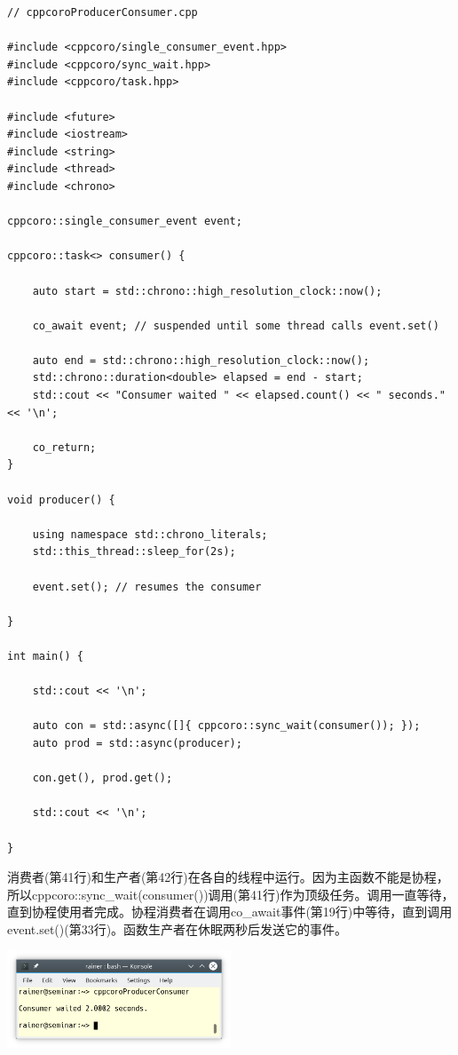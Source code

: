 \begin{lstlisting}[style=styleCXX]
// cppcoroProducerConsumer.cpp

#include <cppcoro/single_consumer_event.hpp>
#include <cppcoro/sync_wait.hpp>
#include <cppcoro/task.hpp>

#include <future>
#include <iostream>
#include <string>
#include <thread>
#include <chrono>

cppcoro::single_consumer_event event;

cppcoro::task<> consumer() {

	auto start = std::chrono::high_resolution_clock::now();
	
	co_await event; // suspended until some thread calls event.set()
	
	auto end = std::chrono::high_resolution_clock::now();
	std::chrono::duration<double> elapsed = end - start;
	std::cout << "Consumer waited " << elapsed.count() << " seconds." << '\n';
	
	co_return;
}

void producer() {

	using namespace std::chrono_literals;
	std::this_thread::sleep_for(2s);
	
	event.set(); // resumes the consumer

}

int main() {

	std::cout << '\n';
	
	auto con = std::async([]{ cppcoro::sync_wait(consumer()); });
	auto prod = std::async(producer);
	
	con.get(), prod.get();
	
	std::cout << '\n';

}
\end{lstlisting}

消费者(第41行)和生产者(第42行)在各自的线程中运行。因为主函数不能是协程，所以cppcoro::sync\_wait(consumer())调用(第41行)作为顶级任务。调用一直等待，直到协程使用者完成。协程消费者在调用co\_await事件(第19行)中等待，直到调用event.set()(第33行)。函数生产者在休眠两秒后发送它的事件。

\begin{center}
\includegraphics[width=0.5\textwidth]{content/5/chapter8/images/3.png}\\
\end{center}

